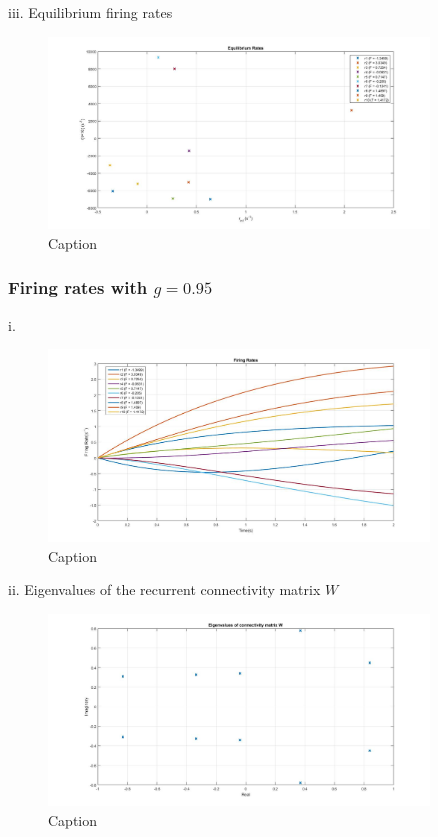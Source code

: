 \documentclass{article}
\begin{document}
iii. Equilibrium firing rates
\begin{figure}[H] 
	\begin{center}
		\includegraphics[width=0.9\textwidth]{Section1/Part2/Retry/Q2a_iii_g2.jpg}
		\caption{Caption \label{Q2a_iii_g2}}
	\end{center}
\end{figure}

\subsubsection{Firing rates with $g = 0.95$}
i. 
\begin{figure}[H] 
	\begin{center}
		\includegraphics[width=0.9\textwidth]{Section1/Part2/Retry/Q2a_i_gInt.jpg}
		\caption{Caption \label{Q2a_i_g2}}
	\end{center}
\end{figure}

ii. Eigenvalues of the recurrent connectivity matrix $W$
\begin{figure}[H] 
	\begin{center}
		\includegraphics[width=0.9\textwidth]{Section1/Part2/Retry/Q2a_ii_gInt.jpg}
		\caption{Caption \label{Q2a_ii_g2}}
	\end{center}
\end{figure}
\end{document}
